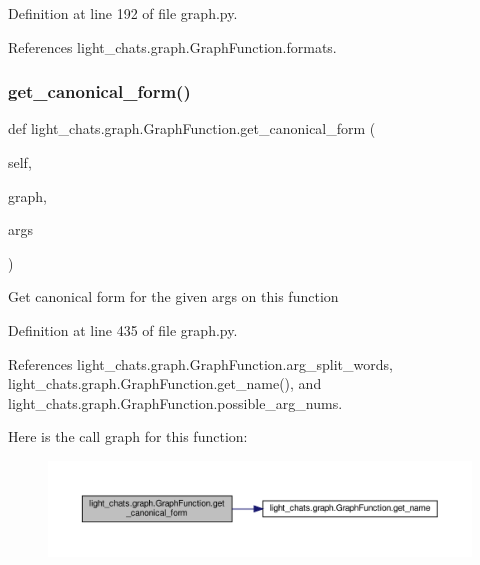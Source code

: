 Definition at line 192 of file graph.\+py.



References light\+\_\+chats.\+graph.\+Graph\+Function.\+formats.

\mbox{\label{classlight__chats_1_1graph_1_1GraphFunction_a0994341bec72be122101ce59da936882}} 
\subsubsection{\texorpdfstring{get\+\_\+canonical\+\_\+form()}{get\_canonical\_form()}}
{\footnotesize\ttfamily def light\+\_\+chats.\+graph.\+Graph\+Function.\+get\+\_\+canonical\+\_\+form (\begin{DoxyParamCaption}\item[{}]{self,  }\item[{}]{graph,  }\item[{}]{args }\end{DoxyParamCaption})}

\begin{DoxyVerb}Get canonical form for the given args on this function\end{DoxyVerb}
 

Definition at line 435 of file graph.\+py.



References light\+\_\+chats.\+graph.\+Graph\+Function.\+arg\+\_\+split\+\_\+words, light\+\_\+chats.\+graph.\+Graph\+Function.\+get\+\_\+name(), and light\+\_\+chats.\+graph.\+Graph\+Function.\+possible\+\_\+arg\+\_\+nums.

Here is the call graph for this function\+:
\nopagebreak
\begin{figure}[H]
\begin{center}
\leavevmode
\includegraphics[width=350pt]{classlight__chats_1_1graph_1_1GraphFunction_a0994341bec72be122101ce59da936882_cgraph}
\end{center}
\end{figure}
\mbox{\label{classlight__chats_1_1graph_1_1GraphFunction_ab20674b5c6c05a6c5188e51bc991717f}} 
